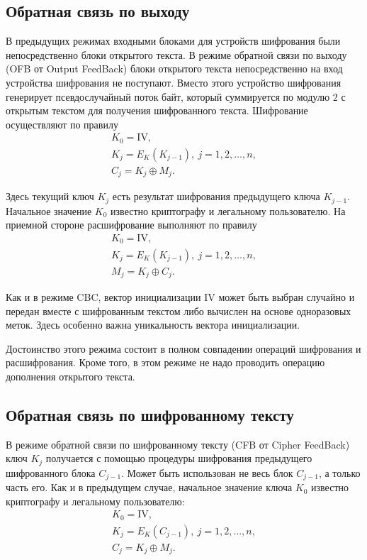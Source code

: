 \subsection{Обратная связь по выходу}

В предыдущих режимах входными блоками для устройств шифрования были непосредственно блоки открытого текста.
В режиме обратной связи по выходу (OFB от Output FeedBack) блоки открытого текста непосредственно на вход устройства шифрования не поступают. Вместо этого устройство шифрования генерирует псевдослучайный поток байт, который суммируется по модулю $2$ с открытым текстом для получения шифрованного текста. Шифрование осуществляют по правилу
\[ \begin{array}{l}
    K_0 = \textrm{IV}, \\
    K_j = E_K(K_{j-1}), ~ j = 1, 2, \dots, n, \\
    C_j = K_j \oplus M_j.
\end{array} \]

Здесь текущий ключ $K_j$ есть результат шифрования предыдущего ключа $K_{j-1}$. Начальное значение $K_0$ известно криптографу и легальному пользователю. На приемной стороне расшифрование выполняют по правилу
\[ \begin{array}{l}
    K_0 = \textrm{IV}, \\
    K_j = E_K(K_{j-1}), ~ j = 1, 2, \dots, n, \\
    M_j = K_j \oplus C_j.
\end{array} \]

Как и в режиме CBC, вектор инициализации $\textrm{IV}$ может быть выбран случайно и передан вместе с шифрованным текстом либо вычислен на основе одноразовых меток. Здесь особенно важна уникальность вектора инициализации.

Достоинство этого режима состоит в полном совпадении операций шифрования и расшифрования. Кроме того, в этом режиме не надо проводить операцию дополнения открытого текста.


\subsection{Обратная связь по шифрованному тексту}

В режиме обратной связи по шифрованному тексту (CFB от Cipher FeedBack) ключ $K_j$ получается с помощью процедуры шифрования предыдущего шифрованного блока $C_{j-1}$. Может быть использован не весь блок $C_{j-1}$, а только часть его. Как и в предыдущем случае, начальное значение ключа $K_0$ известно криптографу и легальному пользователю:
\[ \begin{array}{l}
    K_0 = \textrm{IV}, \\
    K_j = E_K(C_{j-1}), ~ j = 1, 2, \dots, n,\\
    C_j = K_j \oplus M_j.
\end{array} \]

